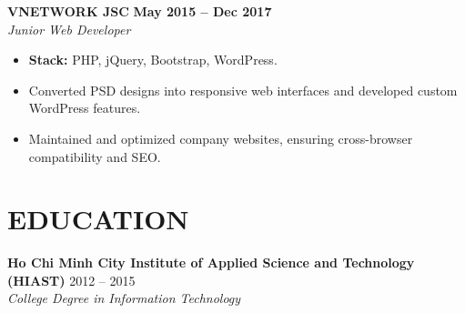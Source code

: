 \documentclass[11pt,a4paper]{article}
\begin{document}
\vspace{8pt}

\noindent \textbf{VNETWORK JSC} \hfill \textbf{May 2015 -- Dec 2017} \\
\textit{Junior Web Developer}
\begin{itemize}
    \item \textbf{Stack:} PHP, jQuery, Bootstrap, WordPress.
    \item Converted PSD designs into responsive web interfaces and developed custom WordPress features.
    \item Maintained and optimized company websites, ensuring cross-browser compatibility and SEO.
\end{itemize}

\vspace{8pt}

\section*{EDUCATION}
\noindent\textbf{Ho Chi Minh City Institute of Applied Science and Technology (HIAST)} \hfill 2012 -- 2015\\
\textit{College Degree in Information Technology}
\end{document}
